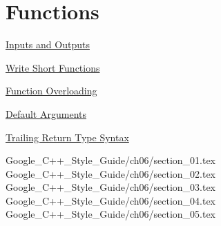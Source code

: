 
\chapter{Functions}\label{ch:functions}

\begin{introduction}
    \item \hyperref[sec:inputs-and-outputs]{Inputs and Outputs}
    \item \hyperref[sec:write-short-functions]{Write Short Functions}
    \item \hyperref[sec:function-overloading]{Function Overloading}
    \item \hyperref[sec:default-arguments]{Default Arguments}
    \item \hyperref[sec:trailing-return-type-syntax]{Trailing Return Type Syntax}
\end{introduction}

{Google_C++_Style_Guide/ch06/section_01.tex}
{Google_C++_Style_Guide/ch06/section_02.tex}
{Google_C++_Style_Guide/ch06/section_03.tex}
{Google_C++_Style_Guide/ch06/section_04.tex}
{Google_C++_Style_Guide/ch06/section_05.tex}
